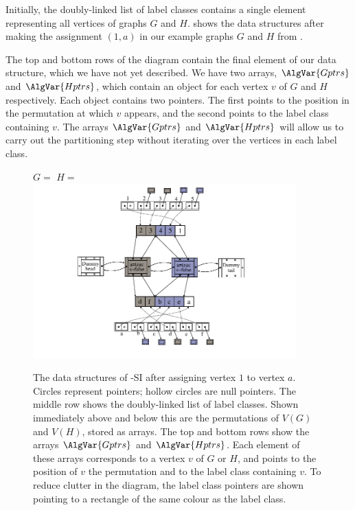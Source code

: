 Initially, the doubly-linked list of label classes contains a single element representing
all vertices of graphs $G$ and $H$.   shows the data structures
after making the assignment $(1,a)$ in our example graphs $G$ and $H$ from .

The top and bottom rows of the diagram contain the final element of our data structure, which we
have not yet described.  We have two arrays, $\AlgVar{Gptrs}$ and $\AlgVar{Hptrs}$, which contain
an object for each vertex $v$ of $G$ and $H$ respectively.  Each object contains two pointers.
The first points to the position in the permutation at which $v$ appears, and the second points
to the label class containing $v$.  The arrays $\AlgVar{Gptrs}$ and $\AlgVar{Hptrs}$ will allow
us to carry out the partitioning step without iterating over the vertices in each label class.

\begin{figure}[h!]
    \centering
    $G=$
    \qquad\qquad
    $H=$
    \includegraphics*[width=0.9\textwidth]{14b-mcsplit-induced-si/figs/data-structure-step-1}
    \caption{The data structures of \McSplit-SI after assigning vertex $1$ to vertex $a$.
        Circles represent pointers; hollow circles are null pointers.  The middle row shows
        the doubly-linked list of label classes.  Shown immediately above and below this are the
        permutations of $V(G)$ and $V(H)$, stored as arrays.  The top and bottom rows
        show the arrays $\AlgVar{Gptrs}$ and $\AlgVar{Hptrs}$.  Each element of these arrays
        corresponds to a vertex $v$ of $G$ or $H$, and points to the position of $v$
        the permutation and to the label class containing $v$.  To reduce clutter in the diagram,
        the label class pointers are shown pointing to a rectangle of the same colour as the
        label class.}
    \label{figure:si-data-structures}
\end{figure}

